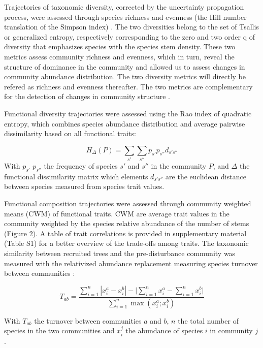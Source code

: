 \documentclass[fleqn,10pt]{ArtEcoFoG} %
\begin{document}
Trajectories of taxonomic diversity, corrected by the uncertainty propagation process, were assessed through species richness and evenness (the Hill number translation of the Simpson index) \citep{Chao2015, Marcon2015}.
The two diversities belong to the set of Tsallis or generalized entropy, respectively corresponding to the zero and two order q of diversity that emphasizes species with the species stem density. These two metrics assess community richness and evenness, which in turn, reveal the structure of dominance in the community and allowed us to assess changes in community abundance distribution.
The two diversity metrics will directly be refered as richness and evenness thereafter.
The two metrics are complementary for the detection of changes in community structure \citep{Magurran2004}.

Functional diversity trajectories were assessed using the Rao index of quadratic entropy, which combines species abundance distribution and average pairwise dissimilarity based on all functional traits:

\[H_\Delta(P) = \sum_{s'}\sum_{s''}p_{s'}p_{s''}d_{s's''}\]
With \(p_{s'}\) \(p_{s''}\) the frequency of species \(s'\) and \(s''\) in the community \(P\), and \(\Delta\) the functional dissimilarity matrix which elements \(d_{s's''}\) are the euclidean distance between species measured from species trait values.

Functional composition trajectories were assessed through community weighted means (CWM) of functional traits. CWM are average trait values in the community weighted by the species relative abundance of the number of stems \citep{Diaz2007} (Figure 2).
A table of trait correlations is provided in supplementary material (Table S1) for a better overview of the trade-offs among traits.
The taxonomic similarity between recruited trees and the pre-disturbance community was measured with the relativized abundance replacement measuring species turnover between communities \citep{Podani2013a}:

\begin{equation}
T_{ab}=\frac{\sum_{i=1}^{n}|x_i^a - x_i^b| - \bigg| \sum_{i=1}^{n}{x_i^a} - \sum_{i=1}^{n}{x_i^b} \bigg|}{\sum_{i=1}^{n}\max{\left( x_i^a;x_i^b \right)}}
\label{eq:formNestedness}
\end{equation}

With \(T_{ab}\) the turnover between communities \(a\) and \(b\), \(n\) the total number of species in the two communities and \(x_{i}^{j}\) the abundance of species \(i\) in community \(j\).
\end{document}
